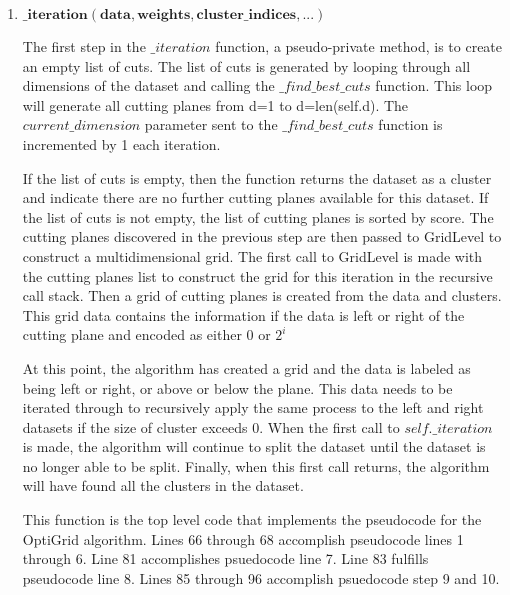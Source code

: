 \begin{enumerate}
    \item $\mathbf{\_iteration(data, weights, cluster\_indices, ...)}$\newline
    {The first step in the $\_iteration$ function, a pseudo-private method, is to create an empty list of cuts. 
    The list of cuts is generated by looping through all dimensions of the dataset and calling the $\_find\_best\_cuts$ function. This loop will generate all cutting planes from d=1 to d=len(self.d). 
    The $current\_dimension$ parameter sent to the $\_find\_best\_cuts$ function is incremented by 1 each iteration.\par
    If the list of cuts is empty, then the function returns the dataset as a cluster and indicate there are no further cutting planes available for this dataset. 
    If the list of cuts is not empty, the list of cutting planes is sorted by score. 
    The cutting planes discovered in the previous step are then passed to GridLevel to construct a multidimensional grid. 
    The first call to GridLevel is made with the cutting planes list to construct the grid for this iteration in the recursive call stack. 
    Then a grid of cutting planes is created from the data and clusters. This grid data contains the information if the data is left or right of the cutting plane and encoded as either 0 or ${2^i}$\par
    At this point, the algorithm has created a grid and the data is labeled as being left or right, or above or below the plane. 
    This data needs to be iterated through to recursively apply the same process to the left and right datasets if the size of cluster exceeds 0.
    When the first call to $self.\_iteration$ is made, the algorithm will continue to split the dataset until the dataset is no longer able to be split. 
    Finally, when this first call returns, the algorithm will have found all the clusters in the dataset.\par
    This function is the top level code that implements the pseudocode for the OptiGrid algorithm. Lines 66 through 68 accomplish pseudocode lines 1 through 6. Line 81 accomplishes psuedocode line 7. Line 83 fulfills pseudocode line 8. Lines 85 through 96 accomplish psuedocode step 9 and 10.}       



\end{enumerate}
